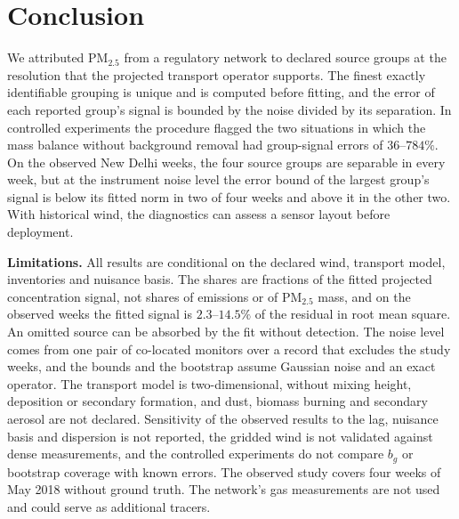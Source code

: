 \section{Conclusion}
\label{sec:discussion_conclusion}

We attributed PM\(_{2.5}\) from a regulatory network to declared source groups at the
resolution that the projected transport operator supports.  The finest exactly
identifiable grouping is unique and is computed before fitting, and the error of each
reported group's signal is bounded by the noise divided by its separation.  In
controlled experiments the procedure flagged the two situations in which the mass
balance without background removal had group-signal errors of \(36\)--\(784\%\).  On the
observed New Delhi weeks, the four source groups are separable in
every week, but at the instrument noise level the error bound of the largest group's
signal is below its fitted norm in two of four weeks and above it in the other two.  With
historical wind, the diagnostics can assess a sensor layout before deployment.

\noindent\textbf{Limitations.}
All results are conditional on the declared wind, transport model, inventories and
nuisance basis.  The shares are fractions of the fitted projected
concentration signal, not shares of emissions or of PM\(_{2.5}\) mass, and
on the observed weeks the fitted signal is \(2.3\)--\(14.5\%\) of the residual in root mean
square.  An omitted source can be absorbed by the fit without detection.  The noise level comes
from one pair of co-located monitors over a record that excludes the study weeks, and
the bounds and the bootstrap assume Gaussian noise and an exact operator.  The transport
model is two-dimensional, without mixing height, deposition or secondary formation, and
dust, biomass burning and secondary aerosol are not declared.  Sensitivity of the
observed results to the lag, nuisance basis and dispersion is not reported, the gridded
wind is not validated against dense measurements, and the controlled experiments
do not compare \(b_g\) or bootstrap coverage with known errors.  The observed study
covers four weeks of May 2018 without ground truth.  The
network's gas measurements are not used and could serve as additional tracers.
